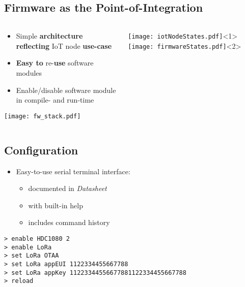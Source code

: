 
\subsection{Firmware as the Point-of-Integration}

\begin{frame}%
  \centering
      
    \begin{columns}
      \begin{column}{0.6\paperwidth}
         \centering
         \begin{itemize}
           \item Simple {\bf architecture reflecting} IoT node {\bf use-case}
           \item {\bf Easy to} re-{\bf use} software modules
           \item Enable/disable software module in compile- and run-time
         \end{itemize}
         \vfill
         \texttt{[image: fw\_stack.pdf]}
      \end{column}
      \begin{column}{0.4\paperwidth}
           \texttt{[image: iotNodeStates.pdf]}<1>
           \texttt{[image: firmwareStates.pdf]}<2>
       \end{column}
    \end{columns}
  
\end{frame}

\subsection{Configuration}

\begin{frame}[fragile]%
  \centering
    
\begin{itemize}
  \item Easy-to-use serial terminal interface:
  \begin{itemize}
    \item documented in {\it Datasheet}
    \item with built-in help
    \item includes command history
  \end{itemize}
\end{itemize}

\vspace{1cm}
    
  \begin{Verbatim}[frame=single, fontsize=\scriptsize]
> enable HDC1080 2
> enable LoRa
> set LoRa OTAA
> set LoRa appEUI 1122334455667788
> set LoRa appKey 11223344556677881122334455667788
> reload
 \end{Verbatim}
 
  
\end{frame}

